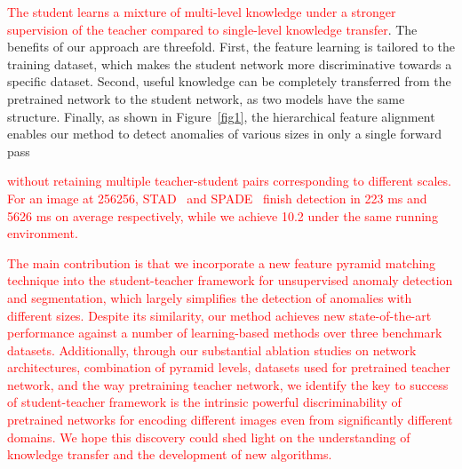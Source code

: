 \documentclass[final]{cvpr}
\begin{document}
\textcolor{red}{The student learns a mixture of multi-level knowledge under a stronger supervision of the teacher compared to single-level knowledge transfer}. The benefits of our approach are threefold. First, the feature learning is tailored to the training dataset, which makes the student network more discriminative towards a specific dataset. Second, useful knowledge can be completely transferred from the pretrained network to the student network, as two models have the same structure. Finally, as shown in Figure~\ref{fig1}, the hierarchical feature alignment enables our method to detect anomalies of various sizes in only a single forward pass \textcolor{red}{without retaining multiple teacher-student pairs corresponding to different scales. For an image at 256256, STAD~\cite{Bergmann2020} and  SPADE~\cite{Cohen2020} finish detection in 223 ms and 5626 ms on average respectively, while we achieve 10.2 under the same running environment.


\textcolor{red}{The main contribution is that we incorporate a new feature pyramid matching technique into the student-teacher framework for unsupervised anomaly detection and segmentation, which largely simplifies the detection of anomalies with different sizes. Despite its similarity, our method achieves new state-of-the-art performance against a number of learning-based methods over three benchmark datasets. Additionally, through our substantial ablation studies on   network architectures,  combination of pyramid levels,  datasets used for pretrained teacher network, and  the way pretraining teacher network, we identify the key to success of student-teacher framework is the intrinsic powerful discriminability of pretrained networks for encoding different images even from significantly different domains. We hope this discovery could shed light on the understanding of knowledge transfer and the development of new algorithms.}
\fi

\iffalse
\begin{itemize}
	\item We propose a student-teacher learning framework for unsupervised anomaly detection and segmentation. A new feature pyramid alignment technique is incorporated into the framework, which largely simplify the detection of anomalies with different sizes.
	\item We compare our approach with a large number of deep learning-based methods over three benchmark datasets. Our method achieves new state-of-the-art performance in all cases.
	\item We conduct substantial ablation studies that our method is independent of the backbone network structure. We also discovery a couple of interesting phenomena that perhaps shed light on the understanding of knowledge transfer and the development of new algorithms.
\end{itemize}
\fi

}
\end{document}
